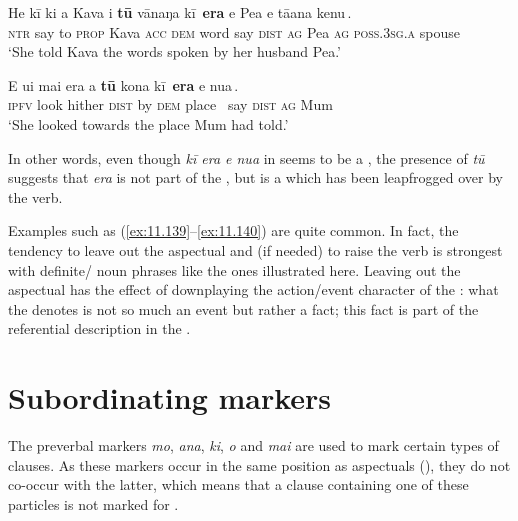 \ea\label{ex:11.139}
\gll He kī ki a Kava i \textbf{tū} vānaŋa {\ob}kī\,{\cb} \textbf{era} {\ob}e Pea e tā{\ꞌ}ana kenu\,{\cb}. \\
\textsc{ntr} say to \textsc{prop} Kava \textsc{acc} \textsc{dem} word {\db}say \textsc{dist} {\db}\textsc{ag} Pea \textsc{ag} \textsc{poss.3sg.a} spouse \\
\glt 
‘She told Kava the words spoken by her husband Pea.’ \textstyleExampleref{[R229.075]} 
\z

\ea\label{ex:11.140}
\gll E u{\ꞌ}i mai era a \textbf{tū} kona {\ob}kī\,{\cb} \textbf{era} {\ob}e nua\,{\cb}. \\
\textsc{ipfv} look hither \textsc{dist} by \textsc{dem} place ~say \textsc{dist} {\db}\textsc{ag} Mum \\

\glt
‘She looked towards the place Mum had told.’ \textstyleExampleref{[R210.083]} 
\z

In other words, even though \textit{kī era e nua} in  seems to be a , the presence of \textit{tū} suggests that \textit{era} is not part of the , but is a   which has been leapfrogged over by the verb.

Examples such as (\ref{ex:11.139}–\ref{ex:11.140}) are quite common. In fact, the tendency to leave out the aspectual and (if needed) to raise the verb is strongest with definite/ noun phrases like the ones illustrated here. Leaving out the aspectual has the effect of downplaying the action/event character of the : what the  denotes is not so much an event but rather a fact; this fact is part of the referential description in the .
\section{Subordinating markers}\label{sec:11.5}

The preverbal markers \textit{mo}, \textit{ana}, \textit{ki}, \textit{{\ꞌ}o} and \textit{mai} are used to mark certain types of clauses. As these markers occur in the same position as aspectuals (), they do not co-occur with the latter, which means that a clause containing one of these particles is not marked for .


